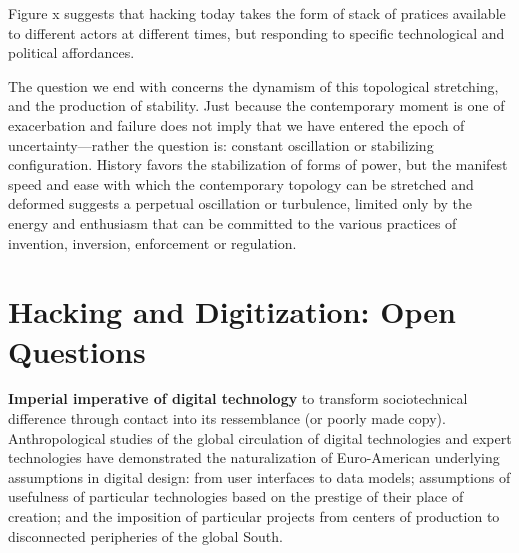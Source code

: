 \documentclass[10pt,letter,oneside]{scrartcl}
\begin{document}
Figure x suggests that hacking today takes the form of stack of pratices
available to different actors at different times, but responding to specific
technological and political affordances.


The question we end with concerns the dynamism of this topological stretching, 
and the production of stability.  Just because the contemporary moment is one of exacerbation and failure does not imply that we have entered the epoch of 
uncertainty---rather the question is: constant oscillation or stabilizing 
configuration.  History favors the stabilization of forms of power, but 
the manifest speed and ease with which the contemporary topology can be 
stretched and deformed suggests a perpetual oscillation or turbulence, 
limited only by the energy and enthusiasm that can be committed to
the various practices of invention, inversion, enforcement or regulation.  


\section{Hacking and Digitization: Open Questions}

{\bf Imperial imperative of digital technology} to transform sociotechnical
difference through contact into its ressemblance (or poorly made copy).
Anthropological studies of the global circulation of digital technologies and
expert technologies have demonstrated the naturalization of Euro-American
underlying assumptions in digital design: from user interfaces to data models; 
assumptions of usefulness of particular technologies based on the prestige of 
their place of creation; and the imposition of particular projects
from centers of production to disconnected peripheries of the global South.

\end{document}
